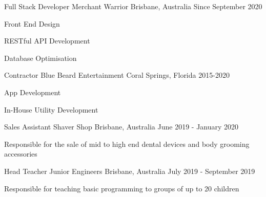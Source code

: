 


\begin{cventries}

\cventry
{Full Stack Developer} %
{Merchant Warrior} %
{Brisbane, Australia} %
{Since September 2020} %
{ %
\begin{cvitems}
\item {Front End Design}
\item {RESTful API Development}
\item {Database Optimisation}
\end{cvitems}
}


\cventry
{Contractor} %
{Blue Beard Entertainment} %
{Coral Springs, Florida} %
{2015-2020} %
{ %
\begin{cvitems}
\item {App Development}
\item {In-House Utility Development}
\end{cvitems}
}



\cventry
{Sales Assistant} %
{Shaver Shop} %
{Brisbane, Australia} %
{June 2019 - January 2020} %
{ %
\begin{cvitems}
\item {Responsible for the sale of mid to high end dental devices and body grooming accessories}
\end{cvitems}
}


\cventry
{Head Teacher} %
{Junior Engineers} %
{Brisbane, Australia} %
{July 2019 - September 2019} %
{ %
\begin{cvitems}
\item {Responsible for teaching basic programming to groups of up to 20 children}
\end{cvitems}
}


\end{cventries}
